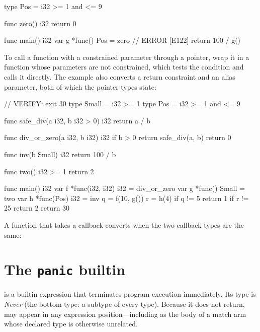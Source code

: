 \begin{laincode}
type Pos = i32 >= 1 and <= 9

func zero() i32 { return 0 }

func main() i32 {
    var g *func() Pos = zero    // ERROR [E122]
    return 100 / g()
}
\end{laincode}

\pnum
To call a function with a constrained parameter through a pointer, wrap it in a function whose
parameters are not constrained, which tests the condition and calls it directly.  The example
also converts a return constraint and an alias parameter, both of which the pointer types state:

\begin{laincode}
// VERIFY: exit 30
type Small = i32 >= 1
type Pos = i32 >= 1 and <= 9

func safe_div(a i32, b i32 > 0) i32 { return a / b }

func div_or_zero(a i32, b i32) i32 {
    if b > 0 { return safe_div(a, b) }
    return 0
}

func inv(b Small) i32 { return 100 / b }

func two() i32 >= 1 { return 2 }

func main() i32 {
    var f *func(i32, i32) i32 = div_or_zero
    var g *func() Small = two
    var h *func(Pos) i32 = inv
    q = f(10, g())
    r = h(4)
    if q != 5 { return 1 }
    if r != 25 { return 2 }
    return 30
}
\end{laincode}

\pnum
A function that takes a callback converts when the two callback types are the same:


\section{The \texttt{panic} builtin}
\label{sec:fn.panic}

\pnum
{} is a builtin expression that terminates program
execution immediately.  Its type is \textit{Never} (the bottom type:
a subtype of every type).  Because it does not return, 
may appear in any expression position---including as the body of a
match arm whose declared type is otherwise unrelated.


